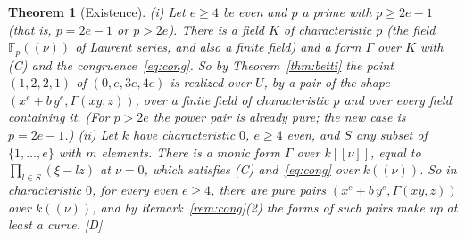 \documentclass[11pt]{article}
\newtheorem{thmletter}{Theorem}
\theoremstyle{definition}
\theoremstyle{remark}
\newcommand{\F}{\mathbb{F}}
\begin{document}
\begin{thmletter}[Existence]\label{thm:exist}
(i) Let $e\ge4$ be even and $p$ a prime with $p\ge2e-1$ (that is, $p=2e-1$ or $p>2e$). There is a field $K$ of characteristic $p$ (the field $\F_p((\nu))$ of Laurent series, and also a finite field) and a form $\Gamma$ over $K$ with (C) and the congruence~\eqref{eq:cong}. So by Theorem~\ref{thm:betti} the point $(1,2,2,1)$ of $(0,e,3e,4e)$ is realized over $U$, by a pair of the shape $(x^e+b\,y^e,\Gamma(xy,z))$, over a finite field of characteristic $p$ and over every field containing it. (For $p>2e$ the power pair is already pure; the new case is $p=2e-1$.) (ii) Let $k$ have characteristic $0$, $e\ge4$ even, and $S$ any subset of $\{1,\dots,e\}$ with $m$ elements. There is a monic form $\Gamma$ over $k[[\nu]]$, equal to $\prod_{l\in S}(\xi-lz)$ at $\nu=0$, which satisfies (C) and~\eqref{eq:cong} over $k((\nu))$. So in characteristic $0$, for every even $e\ge4$, there are pure pairs $(x^e+b\,y^e,\Gamma(xy,z))$ over $k((\nu))$, and by Remark~\ref{rem:cong}(2) the forms of such pairs make up at least a curve. [D]
\end{thmletter}
\end{document}
